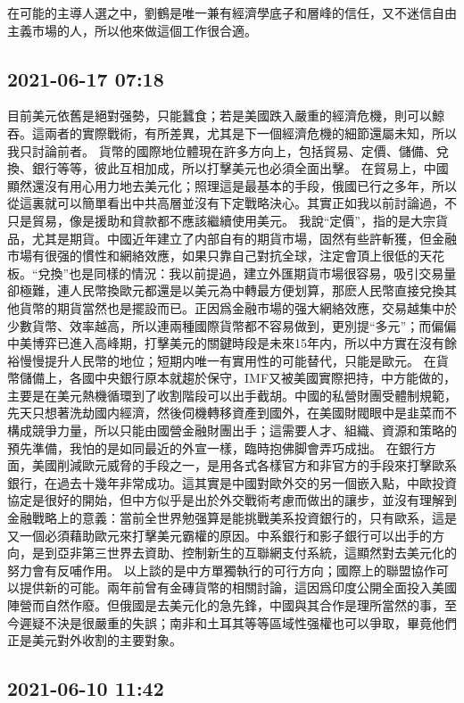 \documentclass[twocolumn]{ctexart}
\begin{document}
在可能的主導人選之中，劉鶴是唯一兼有經濟學底子和層峰的信任，又不迷信自由主義市場的人，所以他來做這個工作很合適。
\subsection*{2021-06-17 07:18}

目前美元依舊是絕對强勢，只能蠶食；若是美國跌入嚴重的經濟危機，則可以鯨吞。這兩者的實際戰術，有所差異，尤其是下一個經濟危機的細節還屬未知，所以我只討論前者。
貨幣的國際地位體現在許多方向上，包括貿易、定價、儲備、兌換、銀行等等，彼此互相加成，所以打擊美元也必須全面出擊。
在貿易上，中國顯然還沒有用心用力地去美元化；照理這是最基本的手段，俄國已行之多年，所以從這裏就可以簡單看出中共高層並沒有下定戰略決心。其實正如我以前討論過，不只是貿易，像是援助和貸款都不應該繼續使用美元。
我說“定價”，指的是大宗貨品，尤其是期貨。中國近年建立了内部自有的期貨市場，固然有些許斬獲，但金融市場有很强的慣性和網絡效應，如果只靠自己對抗全球，注定會頂上很低的天花板。“兌換”也是同樣的情況：我以前提過，建立外匯期貨市場很容易，吸引交易量卻極難，連人民幣換歐元都還是以美元為中轉最方便划算，那麽人民幣直接兌換其他貨幣的期貨當然也是擺設而已。正因爲金融市場的强大網絡效應，交易越集中於少數貨幣、效率越高，所以連兩種國際貨幣都不容易做到，更別提“多元”；而偏偏中美博弈已進入高峰期，打擊美元的關鍵時段是未來15年内，所以中方實在沒有餘裕慢慢提升人民幣的地位；短期内唯一有實用性的可能替代，只能是歐元。
在貨幣儲備上，各國中央銀行原本就趨於保守，IMF又被美國實際把持，中方能做的，主要是在美元熱機循環到了收割階段可以出手截胡。中國的私營財團受體制規範，先天只想著洗劫國内經濟，然後伺機轉移資產到國外，在美國財閥眼中是韭菜而不構成競爭力量，所以只能由國營金融財團出手；這需要人才、組織、資源和策略的預先準備，我怕的是如同最近的外宣一樣，臨時抱佛脚會弄巧成拙。
在銀行方面，美國削減歐元威脅的手段之一，是用各式各樣官方和非官方的手段來打擊歐系銀行，在過去十幾年非常成功。這其實是中國對歐外交的另一個嵌入點，中歐投資協定是很好的開始，但中方似乎是出於外交戰術考慮而做出的讓步，並沒有理解到金融戰略上的意義：當前全世界勉强算是能挑戰美系投資銀行的，只有歐系，這是又一個必須藉助歐元來打擊美元霸權的原因。中系銀行和影子銀行可以出手的方向，是到亞非第三世界去資助、控制新生的互聯網支付系統，這顯然對去美元化的努力會有反哺作用。
以上談的是中方單獨執行的可行方向；國際上的聯盟協作可以提供新的可能。兩年前曾有金磚貨幣的相關討論，這因爲印度公開全面投入美國陣營而自然作廢。但俄國是去美元化的急先鋒，中國與其合作是理所當然的事，至今遲疑不決是很嚴重的失誤；南非和土耳其等等區域性强權也可以爭取，畢竟他們正是美元對外收割的主要對象。
\subsection*{2021-06-10 11:42}
\end{document}

